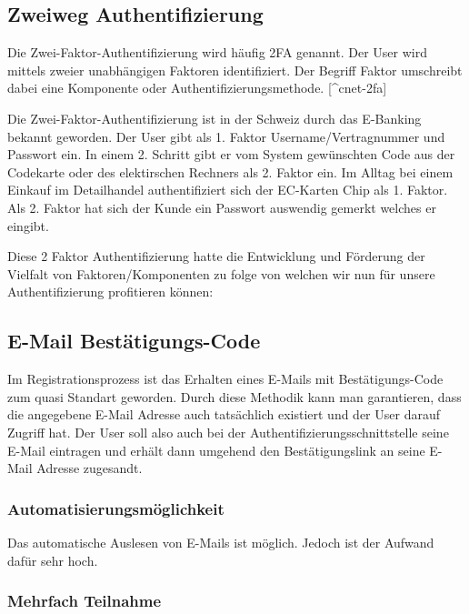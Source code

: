 \subsection{Zweiweg Authentifizierung}\label{zweiweg-authentifizierung}

Die Zwei-Faktor-Authentifizierung wird häufig 2FA genannt. Der User wird
mittels zweier unabhängigen Faktoren identifiziert. Der Begriff Faktor
umschreibt dabei eine Komponente oder Authentifizierungsmethode.
{[}\^{}cnet-2fa{]}

Die Zwei-Faktor-Authentifizierung ist in der Schweiz durch das E-Banking
bekannt geworden. Der User gibt als 1. Faktor Username/Vertragnummer und
Passwort ein. In einem 2. Schritt gibt er vom System gewünschten Code
aus der Codekarte oder des elektirschen Rechners als 2. Faktor ein. Im
Alltag bei einem Einkauf im Detailhandel authentifiziert sich der
EC-Karten Chip als 1. Faktor. Als 2. Faktor hat sich der Kunde ein
Passwort auswendig gemerkt welches er eingibt.

Diese 2 Faktor Authentifizierung hatte die Entwicklung und Förderung der
Vielfalt von Faktoren/Komponenten zu folge von welchen wir nun für
unsere Authentifizierung profitieren können:

\subsection{E-Mail Bestätigungs-Code}\label{e-mail-bestuxe4tigungs-code}

Im Registrationsprozess ist das Erhalten eines E-Mails mit
Bestätigungs-Code zum quasi Standart geworden. Durch diese Methodik kann
man garantieren, dass die angegebene E-Mail Adresse auch tatsächlich
existiert und der User darauf Zugriff hat. Der User soll also auch bei
der Authentifizierungsschnittstelle seine E-Mail eintragen und erhält
dann umgehend den Bestätigungslink an seine E-Mail Adresse zugesandt.

\subsubsection{Automatisierungsmöglichkeit}\label{automatisierungsmuxf6glichkeit-2}

Das automatische Auslesen von E-Mails ist möglich. Jedoch ist der
Aufwand dafür sehr hoch.

\subsubsection{Mehrfach Teilnahme}\label{mehrfach-teilnahme-2}

